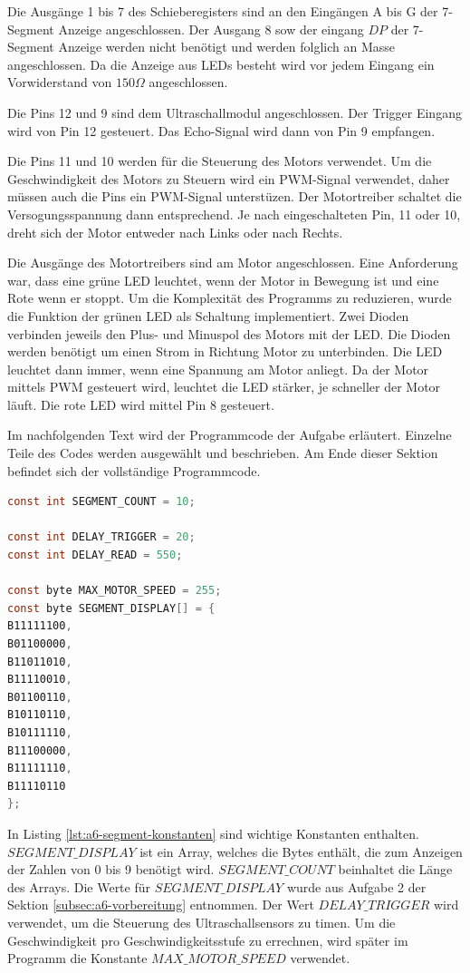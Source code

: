Die Ausgänge 1 bis 7 des Schieberegisters sind an den Eingängen A bis G der 7-Segment Anzeige angeschlossen.
Der Ausgang 8 sow der eingang $DP$ der 7-Segment Anzeige werden nicht benötigt und werden folglich an Masse angeschlossen.
Da die Anzeige aus LEDs besteht wird vor jedem Eingang ein Vorwiderstand von $150\Omega$ angeschlossen.

Die Pins 12 und 9 sind dem Ultraschallmodul angeschlossen.
Der Trigger Eingang wird von Pin 12 gesteuert.
Das Echo-Signal wird dann von Pin 9 empfangen.

Die Pins 11 und 10 werden für die Steuerung des Motors verwendet.
Um die Geschwindigkeit des Motors zu Steuern wird ein PWM-Signal verwendet, daher müssen auch die Pins ein PWM-Signal unterstüzen.
Der Motortreiber schaltet die Versogungsspannung dann entsprechend.
Je nach eingeschalteten Pin, 11 oder 10, dreht sich der Motor entweder nach Links oder nach Rechts.

Die Ausgänge des Motortreibers sind am Motor angeschlossen.
Eine Anforderung war, dass eine grüne LED leuchtet, wenn der Motor in Bewegung ist und eine Rote wenn er stoppt.
Um die Komplexität des Programms zu reduzieren, wurde die Funktion der grünen LED als Schaltung implementiert.
Zwei Dioden verbinden jeweils den Plus- und Minuspol des Motors mit der LED.
Die Dioden werden benötigt um einen Strom in Richtung Motor zu unterbinden.
Die LED leuchtet dann immer, wenn eine Spannung am Motor anliegt.
Da der Motor mittels PWM gesteuert wird, leuchtet die LED stärker, je schneller der Motor läuft.
Die rote LED wird mittel Pin 8 gesteuert.

Im nachfolgenden Text wird der Programmcode der Aufgabe erläutert.
Einzelne Teile des Codes werden ausgewählt und beschrieben.
Am Ende dieser Sektion befindet sich der vollständige Programmcode.

\begin{lstlisting}[language=C,label={lst:a6-segment-konstanten}, caption={Wichtige Konstanten}]
const int SEGMENT_COUNT = 10;

const int DELAY_TRIGGER = 20;
const int DELAY_READ = 550;

const byte MAX_MOTOR_SPEED = 255;
const byte SEGMENT_DISPLAY[] = {
B11111100,
B01100000,
B11011010,
B11110010,
B01100110,
B10110110,
B10111110,
B11100000,
B11111110,
B11110110
};
\end{lstlisting}

In Listing \ref{lst:a6-segment-konstanten} sind wichtige Konstanten enthalten.
$SEGMENT\_DISPLAY$ ist ein Array, welches die Bytes enthält, die zum Anzeigen der Zahlen von 0 bis 9 benötigt wird.
$SEGMENT\_COUNT$ beinhaltet die Länge des Arrays.
Die Werte für $SEGMENT\_DISPLAY$ wurde aus Aufgabe 2 der Sektion \ref{subsec:a6-vorbereitung} entnommen.
Der Wert $DELAY\_TRIGGER$ wird verwendet, um die Steuerung des Ultraschallsensors zu timen.
Um die Geschwindigkeit pro Geschwindigkeitsstufe zu errechnen, wird später im Programm die Konstante $MAX\_MOTOR\_SPEED$ verwendet.


